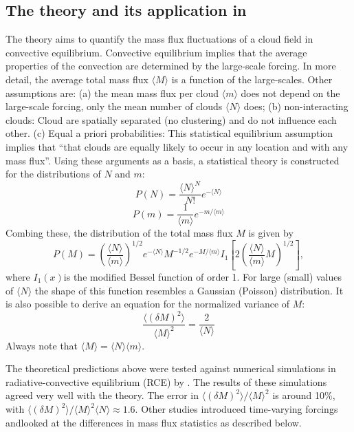\documentclass[a4paper, 12pt]{article}
\begin{document}
\subsection{The \cite{Craig2006} theory and its application in \cite{Plant2008}} 
The \cite[][CC06]{Craig2006} theory aims to quantify the mass flux fluctuations of a cloud field in convective equilibrium. Convective equilibrium implies that the average properties of the convection are determined by the large-scale forcing. In more detail, the average total mass flux $\langle M \rangle$ is a function of the large-scales. Other assumptions are: (a) the mean mass flux per cloud $\langle m \rangle$ does not depend on the large-scale forcing, only the mean number of clouds $\langle N \rangle$ does; (b) non-interacting clouds: Cloud are spatially separated (no clustering) and do not influence each other. (c) Equal a priori probabilities: This statistical equilibrium assumption implies that ``that clouds are equally likely to occur in any location and with any mass flux''. Using these arguments as a basis, a statistical theory is constructed for the distributions of $N$ and $m$:
\begin{equation} \label{eq:N_dist}
 P(N) = \frac{\langle N \rangle^N}{N!}e^{-\langle N \rangle}
\end{equation}
\begin{equation} \label{eq:m_dist}
 P(m) = \frac{1}{\langle m \rangle}e^{-m/\langle m \rangle}
\end{equation}
Combing these, the distribution of the total mass flux $M$ is given by
\begin{equation} \label{eq:M_dist}
 P(M) = \left( \frac{\langle N \rangle}{\langle m \rangle} \right)^{1/2} e^{-\langle N \rangle} M^{-1/2} e^{-M/\langle m \rangle} I_1\left[ 2 \left( \frac{\langle N \rangle}{\langle m \rangle} M \right)^{1/2} \right],
\end{equation}
where $I_1(x)$is the modified Bessel function of order 1. For large (small) values of $\langle N \rangle$ the shape of this function resembles a Gaussian (Poisson) distribution.   
It is also possible to derive an equation for the normalized variance of $M$:
\begin{equation} \label{eq:M_var}
 \frac{\langle (\delta M)^2 \rangle}{\langle M \rangle^2} = \frac{2}{\langle N \rangle}
\end{equation}
Always note that $\langle M \rangle = \langle N \rangle \langle m \rangle$.

The theoretical predictions above were tested against numerical simulations in radiative-convective equilibrium (RCE) by \cite{Cohen2006}. The results of these simulations agreed very well with the theory. The error in $\langle (\delta M)^2 \rangle/\langle M \rangle^2$ is around 10\%, with $\langle (\delta M)^2 \rangle/\langle M \rangle^2 \langle N \rangle \approx 1.6$. Other studies introduced time-varying forcings andlooked at the differences in mass flux statistics as described below.
\end{document}

